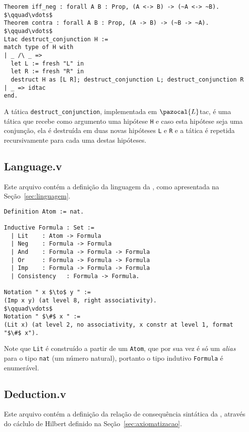       \begin{lstlisting}[name=Utils, frame=single, language=coq]
Theorem iff_neg : forall A B : Prop, (A <-> B) -> (~A <-> ~B).
$\qquad\vdots$
Theorem contra : forall A B : Prop, (A -> B) -> (~B -> ~A).
$\qquad\vdots$
Ltac destruct_conjunction H :=
match type of H with
| _ /\ _ => 
  let L := fresh "L" in
  let R := fresh "R" in
  destruct H as [L R]; destruct_conjunction L; destruct_conjunction R
| _ => idtac
end.
      \end{lstlisting}

      A tática \texttt{destruct\_conjunction}, implementada em $\pazocal{L}$tac, é uma tática que recebe como argumento uma hipótese \texttt{H} e caso esta hipótese seja uma conjunção, ela é destruída em duas novas hipóteses \texttt{L} e \texttt{R} e a tática é repetida recursivamente para cada uma destas hipóteses.

      \subsection{Language.v}\label{sec:language}

      Este arquivo contém a definição da linguagem da \lfium{}, como apresentada na Seção~\ref{sec:linguagem}.

      \begin{lstlisting}[name=Language, frame=single, language=coq]
Definition Atom := nat.

Inductive Formula : Set :=
  | Lit    : Atom -> Formula
  | Neg    : Formula -> Formula
  | And    : Formula -> Formula -> Formula
  | Or     : Formula -> Formula -> Formula
  | Imp    : Formula -> Formula -> Formula
  | Consistency   : Formula -> Formula.

Notation " x $\to$ y " := 
(Imp x y) (at level 8, right associativity).
$\qquad\vdots$
Notation " $\#$ x " :=
(Lit x) (at level 2, no associativity, x constr at level 1, format "$\#$ x").
      \end{lstlisting}
      
      Note que \texttt{Lit} é construído a partir de um \texttt{Atom}, que por sua vez é só um \textit{alias} para o tipo \texttt{nat} (um número natural), portanto o tipo indutivo \texttt{Formula} é enumerável.

    \subsection{Deduction.v}\label{sec:syntax}

      Este arquivo contém a definição da relação de consequência sintática da \lfium{}, através do cáclulo de Hilbert definido na Seção~\ref{sec:axiomatizacao}.

